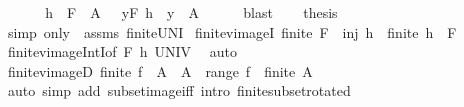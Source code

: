 \begin{isabellebody}
\isamarkupfalse%
\ {\isacharminus}{\kern0pt}\isanewline
\ \ \isamarkupfalse%
\ {\isacharasterisk}{\kern0pt}{\isacharcolon}{\kern0pt}\ {\isachardoublequoteopen}h\ {\isacharminus}{\kern0pt}{\isacharbackquote}{\kern0pt}\ F\ {\isasyminter}\ A\ {\isacharequal}{\kern0pt}\ {\isacharparenleft}{\kern0pt}{\isasymUnion}\ y{\isasymin}F{\isachardot}{\kern0pt}\ {\isacharparenleft}{\kern0pt}h\ {\isacharminus}{\kern0pt}{\isacharbackquote}{\kern0pt}\ {\isacharbraceleft}{\kern0pt}y{\isacharbraceright}{\kern0pt}{\isacharparenright}{\kern0pt}\ {\isasyminter}\ A{\isacharparenright}{\kern0pt}{\isachardoublequoteclose}\isanewline
\ \ \ \ \isamarkupfalse%
\ blast\isanewline
\ \ \isamarkupfalse%
\ {\isacharquery}{\kern0pt}thesis\isanewline
\ \ \ \ \isamarkupfalse%
\ {\isacharparenleft}{\kern0pt}simp\ only{\isacharcolon}{\kern0pt}\ {\isacharasterisk}{\kern0pt}\ assms\ finite{\isacharunderscore}{\kern0pt}UN{\isacharunderscore}{\kern0pt}I{\isacharparenright}{\kern0pt}\isanewline
{}\isamarkupfalse%
%
\endisatagproof
{\isafoldproof}%
%
\isadelimproof
\isanewline
%
\endisadelimproof
\isanewline
{}\isamarkupfalse%
\ finite{\isacharunderscore}{\kern0pt}vimageI{\isacharcolon}{\kern0pt}\ {\isachardoublequoteopen}finite\ F\ {\isasymLongrightarrow}\ inj\ h\ {\isasymLongrightarrow}\ finite\ {\isacharparenleft}{\kern0pt}h\ {\isacharminus}{\kern0pt}{\isacharbackquote}{\kern0pt}\ F{\isacharparenright}{\kern0pt}{\isachardoublequoteclose}\isanewline
%
\isadelimproof
\ \ %
\endisadelimproof
%
\isatagproof
{}\isamarkupfalse%
\ finite{\isacharunderscore}{\kern0pt}vimage{\isacharunderscore}{\kern0pt}IntI{\isacharbrackleft}{\kern0pt}of\ F\ h\ UNIV{\isacharbrackright}{\kern0pt}\ \isamarkupfalse%
\ auto%
\endisatagproof
{\isafoldproof}%
%
\isadelimproof
\isanewline
%
\endisadelimproof
\isanewline
{}\isamarkupfalse%
\ finite{\isacharunderscore}{\kern0pt}vimageD{\isacharprime}{\kern0pt}{\isacharcolon}{\kern0pt}\ {\isachardoublequoteopen}finite\ {\isacharparenleft}{\kern0pt}f\ {\isacharminus}{\kern0pt}{\isacharbackquote}{\kern0pt}\ A{\isacharparenright}{\kern0pt}\ {\isasymLongrightarrow}\ A\ {\isasymsubseteq}\ range\ f\ {\isasymLongrightarrow}\ finite\ A{\isachardoublequoteclose}\isanewline
%
\isadelimproof
\ \ %
\endisadelimproof
%
\isatagproof
{}\isamarkupfalse%
\ {\isacharparenleft}{\kern0pt}auto\ simp\ add{\isacharcolon}{\kern0pt}\ subset{\isacharunderscore}{\kern0pt}image{\isacharunderscore}{\kern0pt}iff\ intro{\isacharcolon}{\kern0pt}\ finite{\isacharunderscore}{\kern0pt}subset{\isacharbrackleft}{\kern0pt}rotated{\isacharbrackright}{\kern0pt}{\isacharparenright}{\kern0pt}%

\end{isabellebody}
